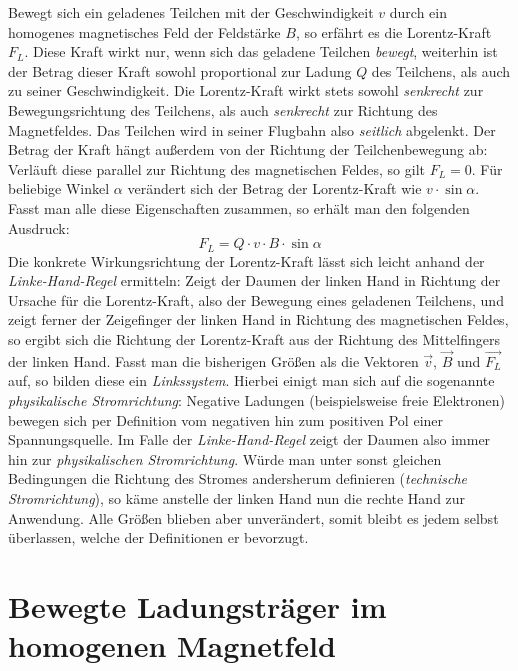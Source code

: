 Bewegt sich ein geladenes Teilchen mit der Geschwindigkeit \(v\) durch ein homogenes magnetisches Feld der Feldst\"arke \(B\),
so erf\"ahrt es die Lorentz-Kraft \(F_L\). Diese Kraft wirkt nur, wenn sich das geladene Teilchen \textit{bewegt}, weiterhin
ist der Betrag dieser Kraft sowohl proportional zur Ladung \(Q\) des Teilchens, als auch zu seiner Geschwindigkeit.
Die Lorentz-Kraft wirkt stets sowohl \textit{senkrecht} zur Bewegungsrichtung des Teilchens, als auch \textit{senkrecht} zur Richtung
des Magnetfeldes. Das Teilchen wird in seiner Flugbahn also
\textit{seitlich} abgelenkt. Der Betrag der Kraft h\"angt au{\ss}erdem von der Richtung der Teilchenbewegung ab: Verl\"auft diese
parallel zur Richtung des magnetischen Feldes, so gilt \(F_L = 0\). F\"ur beliebige Winkel \(\alpha\) ver\"andert
sich der Betrag der Lorentz-Kraft wie \(v \cdot \sin{\alpha}\).
Fasst man alle diese Eigenschaften zusammen, so erh\"alt man den folgenden Ausdruck:
\begin{equation}
  \label{eq:lorentz_abs}
  F_L = Q \cdot v \cdot B \cdot \sin{\alpha}
\end{equation}
Die konkrete Wirkungsrichtung der Lorentz-Kraft l\"asst sich leicht anhand der \textit{Linke-Hand-Regel} ermitteln:
Zeigt der Daumen der linken Hand in Richtung der Ursache f\"ur die Lorentz-Kraft, also der Bewegung eines geladenen Teilchens,
und zeigt ferner der Zeigefinger der linken Hand in Richtung des magnetischen Feldes, so ergibt sich die Richtung der
Lorentz-Kraft aus der Richtung des Mittelfingers der linken Hand. Fasst man die bisherigen Gr\"o{\ss}en als die Vektoren
\(\vec{v}\), \(\vec{B}\) und \(\vec{F_L}\) auf, so bilden diese ein \textit{Linkssystem}.
Hierbei einigt man sich auf die sogenannte \textit{physikalische Stromrichtung}: Negative Ladungen (beispielsweise
freie Elektronen) bewegen sich per Definition vom negativen hin zum positiven Pol einer Spannungsquelle. Im Falle der
\textit{Linke-Hand-Regel} zeigt der Daumen also immer hin zur \textit{physikalischen Stromrichtung}.
W\"urde man unter sonst gleichen Bedingungen die Richtung des Stromes andersherum definieren (\textit{technische Stromrichtung}),
so k\"ame anstelle der linken Hand nun die rechte Hand zur Anwendung. Alle Gr\"o{\ss}en blieben aber unver\"andert, somit bleibt es
jedem selbst \"uberlassen, welche der Definitionen er bevorzugt.

\section{Bewegte Ladungstr\"ager im homogenen Magnetfeld}

